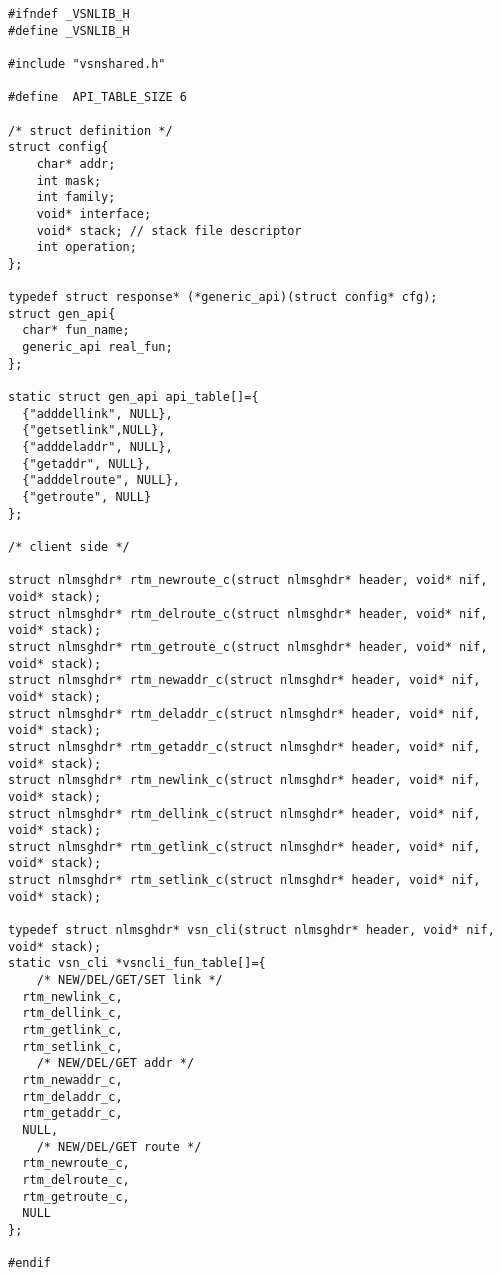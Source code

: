 \begin{lstlisting}[style=CscriptStyle]
#ifndef _VSNLIB_H
#define _VSNLIB_H

#include "vsnshared.h"

#define  API_TABLE_SIZE 6

/* struct definition */
struct config{
	char* addr;
	int mask;
	int family;
	void* interface;
	void* stack; // stack file descriptor
	int operation;
};

typedef struct response* (*generic_api)(struct config* cfg);
struct gen_api{
  char* fun_name;
  generic_api real_fun;
};

static struct gen_api api_table[]={
  {"adddellink", NULL},
  {"getsetlink",NULL},
  {"adddeladdr", NULL},
  {"getaddr", NULL},
  {"adddelroute", NULL},
  {"getroute", NULL}
};

/* client side */

struct nlmsghdr* rtm_newroute_c(struct nlmsghdr* header, void* nif, void* stack);
struct nlmsghdr* rtm_delroute_c(struct nlmsghdr* header, void* nif, void* stack);
struct nlmsghdr* rtm_getroute_c(struct nlmsghdr* header, void* nif, void* stack);
struct nlmsghdr* rtm_newaddr_c(struct nlmsghdr* header, void* nif, void* stack);
struct nlmsghdr* rtm_deladdr_c(struct nlmsghdr* header, void* nif, void* stack);
struct nlmsghdr* rtm_getaddr_c(struct nlmsghdr* header, void* nif, void* stack);
struct nlmsghdr* rtm_newlink_c(struct nlmsghdr* header, void* nif, void* stack);
struct nlmsghdr* rtm_dellink_c(struct nlmsghdr* header, void* nif, void* stack);
struct nlmsghdr* rtm_getlink_c(struct nlmsghdr* header, void* nif, void* stack);
struct nlmsghdr* rtm_setlink_c(struct nlmsghdr* header, void* nif, void* stack);

typedef struct nlmsghdr* vsn_cli(struct nlmsghdr* header, void* nif, void* stack);
static vsn_cli *vsncli_fun_table[]={
	/* NEW/DEL/GET/SET link */
  rtm_newlink_c,
  rtm_dellink_c,
  rtm_getlink_c,
  rtm_setlink_c,
	/* NEW/DEL/GET addr */
  rtm_newaddr_c,
  rtm_deladdr_c,
  rtm_getaddr_c,
  NULL,
	/* NEW/DEL/GET route */
  rtm_newroute_c,
  rtm_delroute_c,
  rtm_getroute_c,
  NULL
};

#endif

\end{lstlisting}


